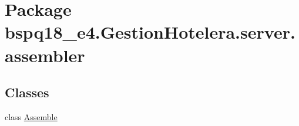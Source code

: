 \hypertarget{namespacebspq18__e4_1_1_gestion_hotelera_1_1server_1_1assembler}{}\section{Package bspq18\+\_\+e4.\+Gestion\+Hotelera.\+server.\+assembler}
\label{namespacebspq18__e4_1_1_gestion_hotelera_1_1server_1_1assembler}
\subsection*{Classes}
\begin{DoxyCompactItemize}
\item 
class \mbox{\hyperlink{classbspq18__e4_1_1_gestion_hotelera_1_1server_1_1assembler_1_1_assemble}{Assemble}}
\end{DoxyCompactItemize}
